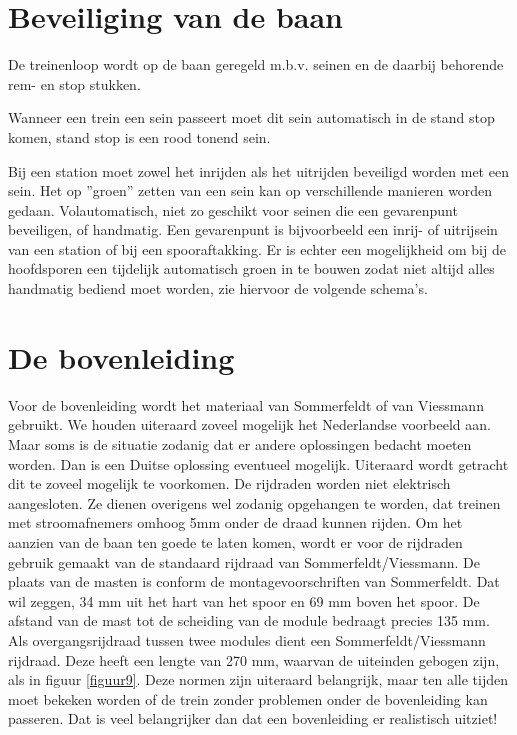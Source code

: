 \documentclass[12pt,a4paper]{report}
\begin{document}
\chapter{Beveiliging van de baan}
\label{ch:beveiliging}

De treinenloop wordt op de baan geregeld m.b.v. seinen en de daarbij behorende rem- en stop stukken.

Wanneer een trein een sein passeert moet dit sein automatisch in de stand stop komen,
stand stop is een rood tonend sein.

Bij een station moet zowel het inrijden als het uitrijden beveiligd worden met een sein. Het op ''groen'' zetten van een sein kan op verschillende manieren worden gedaan. Volautomatisch, niet zo geschikt voor seinen die een gevarenpunt beveiligen, of handmatig.
Een gevarenpunt is bijvoorbeeld een inrij- of uitrijsein van een station of bij een spooraftakking. Er is echter een mogelijkheid om bij de hoofdsporen een tijdelijk automatisch groen in te bouwen zodat niet altijd alles handmatig bediend moet worden, zie hiervoor de volgende schema's.

\chapter{De bovenleiding}
\label{ch:bovenleiding}

Voor de bovenleiding wordt het materiaal van Sommerfeldt of van Viessmann gebruikt. We houden uiteraard zoveel mogelijk het Nederlandse voorbeeld aan. Maar soms is de situatie zodanig dat er andere oplossingen bedacht moeten worden. Dan is een Duitse oplossing eventueel mogelijk. Uiteraard wordt getracht dit te zoveel mogelijk te voorkomen. De rijdraden worden niet elektrisch aangesloten. Ze dienen overigens wel zodanig opgehangen te worden, dat treinen met stroomafnemers omhoog 5mm onder de draad kunnen rijden. Om het aanzien van de baan ten goede te laten komen, wordt er voor de rijdraden gebruik gemaakt van de standaard rijdraad van Sommerfeldt/Viessmann. De plaats van de masten is conform de montagevoorschriften van Sommerfeldt. Dat wil zeggen, 34 mm uit het hart van het spoor en 69 mm boven het spoor. De afstand van de mast tot de scheiding van de module bedraagt precies 135 mm. Als overgangsrijdraad tussen twee modules dient een Sommerfeldt/Viessmann rijdraad. Deze heeft een lengte van 270 mm, waarvan de uiteinden gebogen zijn, als in figuur \ref{figuur9}. Deze normen zijn uiteraard belangrijk, maar ten alle tijden moet bekeken worden of de trein zonder problemen onder de bovenleiding kan passeren. Dat is veel belangrijker dan dat een bovenleiding er realistisch uitziet!
\end{document}
